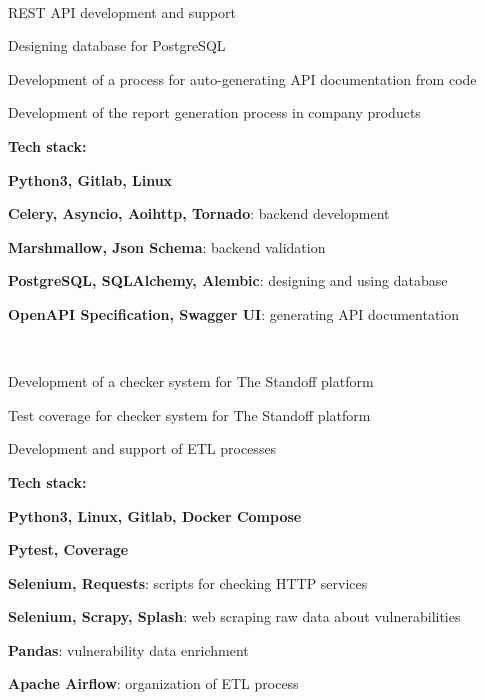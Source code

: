 \documentclass[a4paper]{MagicalCV}
\begin{document}
\hfill
\begin{minipage}[t]{0.66\textwidth} 


 \\
\vspace{\topsep} %
\begin{tightemize}
  \item REST API development and support
  \item Designing database for PostgreSQL
  \item Development of a process for auto-generating API documentation from code
  \item Development of the report generation process in company products
\end{tightemize}
\textbf{Tech stack:} 
\begin{tightemize}
  \item \textbf{Python3, Gitlab, Linux}
  \item \textbf{Celery, Asyncio, Aoihttp, Tornado}: backend development
  \item \textbf{Marshmallow, Json Schema}: backend validation
  \item \textbf{PostgreSQL, SQLAlchemy, Alembic}: designing and using database
  \item \textbf{OpenAPI Specification, Swagger UI}: generating API documentation
\end{tightemize}
\sectionsep

 \\
\vspace{\topsep} %
\begin{tightemize}
  \item Development of a checker system for The Standoff platform
  \item Test coverage for checker system for The Standoff platform
  \item Development and support of ETL processes
\end{tightemize}
\textbf{Tech stack:}
\begin{tightemize}
  \item \textbf{Python3, Linux, Gitlab, Docker Compose}
  \item \textbf{Pytest, Coverage}
  \item \textbf{Selenium, Requests}: scripts for checking HTTP services
  \item \textbf{Selenium, Scrapy, Splash}: web scraping raw data about vulnerabilities
  \item \textbf{Pandas}: vulnerability data enrichment
  \item \textbf{Apache Airflow}: organization of ETL process
\end{tightemize}
\sectionsep


\end{minipage} 
\end{document}
